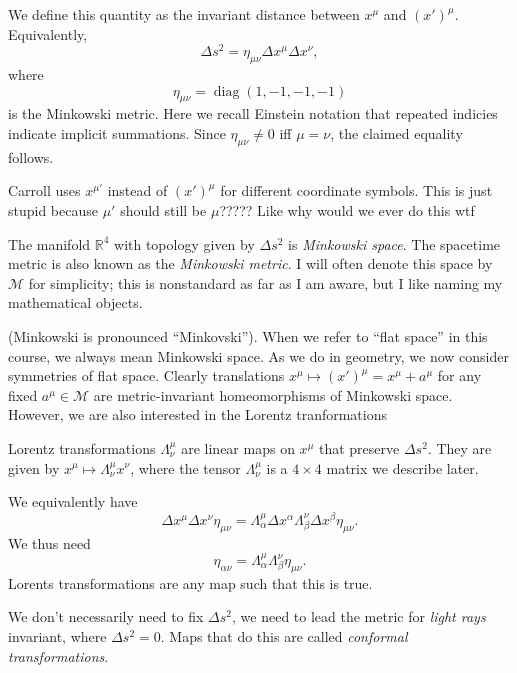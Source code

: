 We define this quantity as the invariant distance between $x^\mu $ and $(x')^\mu $. Equivalently,
\[
	\Delta s^2 = \eta _{\mu \nu } \Delta x^\mu \Delta x^\nu ,
\]
where
\[
	\eta _{\mu \nu } =\operatorname{diag }(1,-1,-1,-1)
\]
is the Minkowski metric. Here we recall Einstein notation that repeated indicies indicate implicit summations. Since $\eta _{\mu \nu } \neq 0$ iff $\mu =\nu $, the claimed equality follows.

\begin{remark}\label{1.1}
	Carroll uses $x^{\mu '} $ instead of $(x')^\mu $ for different coordinate symbols. This is just stupid because $\mu '$ should still be $\mu $????? Like why would we ever do this wtf
\end{remark}

\begin{definition}\label{1.2}
	The manifold $\mathbb{R} ^4$ with topology given by $\Delta s^2$ is \emph{Minkowski space}. The spacetime metric is also known as the \emph{Minkowski metric}. I will often denote this space by $\mathcal{M} $ for simplicity; this is nonstandard as far as I am aware, but I like naming my mathematical objects.
\end{definition}

(Minkowski is pronounced ``Minkovski''). When we refer to ``flat space'' in this course, we always mean Minkowski space. As we do in geometry, we now consider symmetries of flat space. Clearly translations $x^\mu \mapsto (x')^\mu =x^\mu +a^\mu $ for any fixed $a^\mu \in\mathcal{M} $ are metric-invariant homeomorphisms of Minkowski space. However, we are also interested in the Lorentz tranformations

\begin{definition}\label{1.3}
	Lorentz transformations $\Lambda ^\mu _\nu $ are linear maps on $x^\mu $ that preserve $\Delta s^2$. They are given by  $x^\mu \mapsto \Lambda ^\mu _\nu x^\nu $, where the tensor $\Lambda _\nu ^\mu $ is a $4\times 4$ matrix we describe later. 
\end{definition}

We equivalently have
\[
	\Delta x^\mu \Delta x^\nu\eta _{\mu \nu }  =\Lambda ^\mu  _\alpha  \Delta x^\alpha  \Lambda _\beta  ^\nu  \Delta x^\beta  \eta _{\mu \nu } 
.\]
We thus need
\[
	\eta _{\alpha \nu } =\Lambda _\alpha ^\mu \Lambda _\beta ^\nu \eta _{\mu \nu } 
.\]
Lorents transformations are any map such that this is true.

\begin{definition}\label{1.4}
	We don't necessarily need to fix $\Delta s^2$, we need to lead the metric for \emph{light rays} invariant, where $\Delta s^2=0$. Maps that do this are called \emph{conformal transformations}.
\end{definition}

